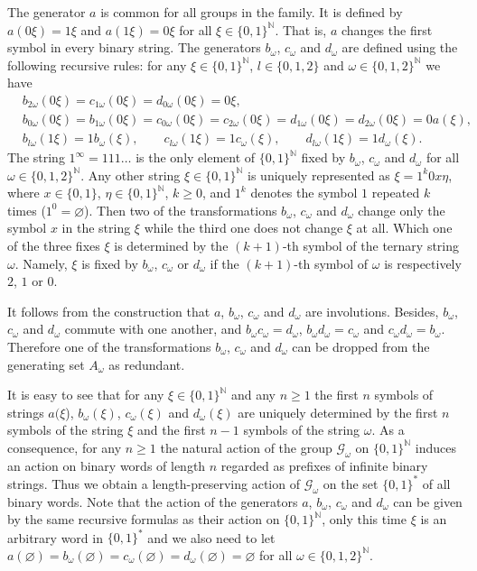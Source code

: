 \documentclass[12pt]{article}
\theoremstyle{definition}
\def\bN{\mathbb{N}}
\def\cG{\mathcal{G}}
\def\om{\omega}
\begin{document}
The generator $a$ is common for all groups in the family.  It is defined by 
$a(0\xi)=1\xi$ and $a(1\xi)=0\xi$ for all $\xi\in\{0,1\}^{\bN}$.  That is, 
$a$ changes the first symbol in every binary string.  The generators 
$b_\om$, $c_\om$ and $d_\om$ are defined using the following recursive 
rules: for any $\xi\in\{0,1\}^{\bN}$, $l\in\{0,1,2\}$ and 
$\om\in\{0,1,2\}^{\bN}$ we have
\begin{eqnarray*}
& b_{2\om}(0\xi)=c_{1\om}(0\xi)=d_{0\om}(0\xi)=0\xi,\\
& b_{0\om}(0\xi)=b_{1\om}(0\xi)=c_{0\om}(0\xi)=c_{2\om}(0\xi)
=d_{1\om}(0\xi)=d_{2\om}(0\xi)=0a(\xi),\\
& b_{l\om}(1\xi)=1b_\om(\xi), \qquad c_{l\om}(1\xi)=1c_\om(\xi), \qquad
d_{l\om}(1\xi)=1d_\om(\xi).
\end{eqnarray*}
The string $1^\infty=111\ldots$ is the only element of $\{0,1\}^{\bN}$ 
fixed by $b_\om$, $c_\om$ and $d_\om$ for all $\om\in\{0,1,2\}^{\bN}$.  Any 
other string $\xi\in\{0,1\}^{\bN}$ is uniquely represented as 
$\xi=1^k0x\eta$, where $x\in\{0,1\}$, $\eta\in\{0,1\}^{\bN}$, $k\ge0$, and 
$1^k$ denotes the symbol $1$ repeated $k$ times ($1^0=\varnothing$).  Then 
two of the transformations $b_\om$, $c_\om$ and $d_\om$ change only the 
symbol $x$ in the string $\xi$ while the third one does not change $\xi$ at 
all.  Which one of the three fixes $\xi$ is determined by the $(k+1)$-th 
symbol of the ternary string $\om$.  Namely, $\xi$ is fixed by $b_\om$, 
$c_\om$ or $d_\om$ if the $(k+1)$-th symbol of $\om$ is respectively $2$, 
$1$ or $0$.

It follows from the construction that $a$, $b_\om$, $c_\om$ and $d_\om$ are 
involutions.  Besides, $b_\om$, $c_\om$ and $d_\om$ commute with one 
another, and $b_\om c_\om=d_\om$, $b_\om d_\om=c_\om$ and $c_\om 
d_\om=b_\om$.  Therefore one of the transformations $b_\om$, $c_\om$ and 
$d_\om$ can be dropped from the generating set $A_\om$ as redundant.

It is easy to see that for any $\xi\in\{0,1\}^{\bN}$ and any $n\ge1$ the 
first $n$ symbols of strings $a(\xi$), $b_\om(\xi)$, $c_\om(\xi)$ and 
$d_\om(\xi)$ are uniquely determined by the first $n$ symbols of the string 
$\xi$ and the first $n-1$ symbols of the string $\om$.  As a consequence, 
for any $n\ge1$ the natural action of the group $\cG_\om$ on 
$\{0,1\}^{\bN}$ induces an action on binary words of length $n$ regarded as 
prefixes of infinite binary strings.  Thus we obtain a length-preserving 
action of $\cG_\om$ on the set $\{0,1\}^*$ of all binary words.  Note that 
the action of the generators $a$, $b_\om$, $c_\om$ and $d_\om$ can be given 
by the same recursive formulas as their action on $\{0,1\}^{\bN}$, only 
this time $\xi$ is an arbitrary word in $\{0,1\}^*$ and we also need to let 
$a(\varnothing)=b_\om(\varnothing)= c_\om(\varnothing)=d_\om(\varnothing) 
=\varnothing$ for all $\om\in\{0,1,2\}^{\bN}$.
\end{document}
